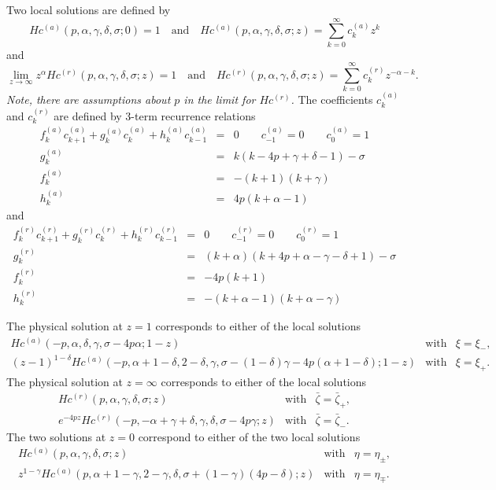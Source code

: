\documentclass[11pt]{article}
\begin{document}
Two local solutions are defined by
\begin{equation}\label{eq:local_a_sol}
 Hc^{(a)}(p,\alpha,\gamma,\delta,\sigma;0)=1 \quad\mbox{and}\quad
 Hc^{(a)}(p,\alpha,\gamma,\delta,\sigma;z) = \sum_{k=0}^\infty{c^{(a)}_kz^k}
\end{equation}
and
\begin{equation}\label{eq:local_r_sol}
 \lim_{z\to\infty}z^\alpha Hc^{(r)}(p,\alpha,\gamma,\delta,\sigma;z)=1
 \quad\mbox{and}\quad
 Hc^{(r)}(p,\alpha,\gamma,\delta,\sigma;z) = \sum_{k=0}^\infty{c^{(r)}_kz^{-\alpha-k}}.
\end{equation}
{\em Note, there are assumptions about $p$ in the limit for
  $Hc^{(r)}$.}  The coefficients $c^{(a)}_k$ and $c^{(r)}_k$ are
defined by 3-term recurrence relations
\begin{eqnarray}
  f^{(a)}_kc^{(a)}_{k+1}+ g^{(a)}_kc^{(a)}_k+ h^{(a)}_kc^{(a)}_{k-1} &=& 0 
  \qquad c^{(a)}_{-1}=0 \qquad c^{(a)}_0=1 \\
  g^{(a)}_k &=& k(k-4p+\gamma+\delta-1)-\sigma \\
  f^{(a)}_k &=& -(k+1)(k+\gamma) \\
  h^{(a)}_k &=& 4p(k+\alpha-1)
\end{eqnarray}
and
\begin{eqnarray}
  f^{(r)}_kc^{(r)}_{k+1}+ g^{(r)}_kc^{(r)}_k+ h^{(r)}_kc^{(r)}_{k-1} &=& 0 
  \qquad c^{(r)}_{-1}=0 \qquad c^{(r)}_0=1 \\
  g^{(r)}_k &=& (k+\alpha)(k+4p+\alpha-\gamma-\delta+1)-\sigma \\
  f^{(r)}_k &=& -4p(k+1) \\
  h^{(r)}_k &=& -(k+\alpha-1)(k+\alpha-\gamma)
\end{eqnarray}

The physical solution at $z=1$ corresponds to either of the local solutions
\begin{eqnarray}\label{eq:local_sol_z1a}
  Hc^{(a)}(-p,\alpha,\delta,\gamma,\sigma-4p\alpha;1-z) &\mbox{with}&
  \xi=\xi_\minus, \\\label{eq:local_sol_z1b}
  (z-1)^{1-\delta}Hc^{(a)}(-p,\alpha+1-\delta,2-\delta,\gamma,\sigma-(1-\delta)\gamma-4p(\alpha+1-\delta);1-z) &\mbox{with}&
  \xi=\xi_+.
\end{eqnarray}
The physical solution at $z=\infty$ corresponds to either of the local solutions
\begin{eqnarray}\label{eq:local_sol_zinfa}
  Hc^{(r)}(p,\alpha,\gamma,\delta,\sigma;z) &\mbox{with}&
  \bar\zeta=\bar\zeta_+, \\\label{eq:local_sol_zinfb}
  e^{-4pz}Hc^{(r)}(-p,-\alpha+\gamma+\delta,\gamma,\delta,\sigma-4p\gamma;z) &\mbox{with}&
  \bar\zeta=\bar\zeta_\minus.
\end{eqnarray}
The two solutions at $z=0$ correspond to either of the two local solutions
\begin{eqnarray}\label{eq:local_sol_z0a}
  Hc^{(a)}(p,\alpha,\gamma,\delta,\sigma;z) &\mbox{with}&
  \eta=\eta_\pm, \\\label{eq:local_sol_z0b}
  z^{1-\gamma}Hc^{(a)}(p,\alpha+1-\gamma,2-\gamma,\delta,\sigma+(1-\gamma)(4p-\delta);z) &\mbox{with}&
  \eta=\eta_\mp.
\end{eqnarray}
\end{document}
